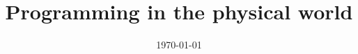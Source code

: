 \documentclass{article}
\title{Programming in the physical world}
\date{\today}
\begin{document}
\maketitle

\begin{abstract}

\end{abstract}




%
%

%



\end{document}
